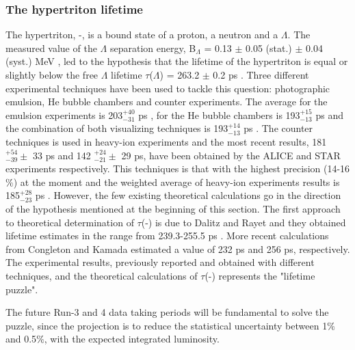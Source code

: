 \subsubsection{The hypertriton lifetime}
The hypertriton, \hyp, is a bound state of a proton, a neutron and a $\Lambda$.
The measured value of the $\Lambda$ separation energy, B$_{\Lambda}$ = 0.13 $\pm$ 0.05 (stat.) $\pm$ 0.04 (syst.) MeV \cite{davis20053}, led to the hypothesis that the lifetime of the hypertriton is equal or slightly below the free $\Lambda$ lifetime $\tau$($\Lambda$) = 263.2 $\pm$ 0.2 ps \cite{pdg:2017}.
Three different experimental techniques have been used to tackle this question: photographic emulsion, He bubble chambers and counter experiments. The average for the emulsion experiments is 203$^{+40}_{-31}$ ps \cite{agnello:2016}, for the He bubble chambers is 193$^{+15}_{-13}$ ps \cite{agnello:2016} and the combination of both visualizing techniques is 193$^{+14}_{-13}$ ps \cite{agnello:2016}. The counter techniques is used in heavy-ion experiments and the most recent results, 181 $^{+54}_{-39} \pm$ 33 ps and 142 $^{+24}_{-21} \pm$ 29 ps, have been obtained by the ALICE \cite{PhysLettB.754.360} and STAR \cite{PhysRevC.97.054909} experiments respectively. This techniques is that with the highest precision (14-16$\%$) at the moment and the weighted average of heavy-ion experiments results is 185$^{+28}_{-23}$ ps \cite{agnello:2016}.
However, the few existing theoretical calculations go in the direction of the hypothesis mentioned at the beginning of this section. The first approach to theoretical determination of $\tau$(\hyp) is due to Dalitz and Rayet and they obtained lifetime estimates in the range from 239.3-255.5 ps \cite{NuovCim.A46}. More recent calculations from Congleton \cite{jphysg.18.339} and Kamada \cite{Phys.Rev.C57} estimated a value of 232 ps and 256 ps, respectively.
The experimental results, previously reported and obtained with different techniques, and the theoretical calculations of $\tau$(\hyp) represents the "lifetime puzzle".

The future Run-3 and 4 data taking periods will be fundamental to solve the puzzle, since the projection is to reduce the statistical uncertainty between 1$\%$ and 0.5$\%$, with the expected integrated luminosity. 


